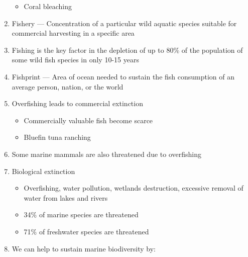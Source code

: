 \documentclass[12pt]{article}
\begin{document}
\begin{enumerate}
\begin{itemize}
\begin{itemize}
        \end{itemize}

      \item Coral bleaching

    \end{itemize}

  \item Fishery — Concentration of a particular wild aquatic species suitable for commercial harvesting in a specific area

  \item Fishing is the key factor in the depletion of up to 80\% of the population of some wild fish species in only 10-15 years

  \item Fishprint — Area of ocean needed to sustain the fish consumption of an average person, nation, or the world

  \item Overfishing leads to commercial extinction

    \begin{itemize}

      \item Commercially valuable fish become scarce

      \item Bluefin tuna ranching

    \end{itemize}

  \item Some marine mammals are also threatened due to overfishing

  \item Biological extinction

    \begin{itemize}

      \item Overfishing, water pollution, wetlands destruction, excessive removal of water from lakes and rivers

      \item 34\% of marine species are threatened

      \item 71\% of freshwater species are threatened

    \end{itemize}

  \item We can help to sustain marine biodiversity by:

    \begin{itemize}


\end{itemize}
\end{enumerate}
\end{document}

